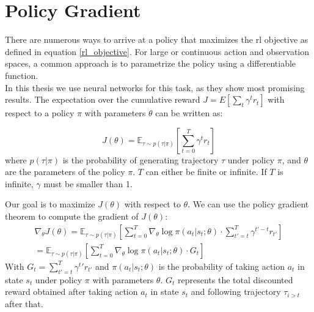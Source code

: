 \section{Policy Gradient}
There are numerous ways to arrive at a policy that maximizes the \ac{rl} objective as defined in equation 
\ref{rl_objective}. For large or continuous action and observation spaces, a common approach is 
to parametrize the policy using a differentiable function.\\ 
In this thesis we use neural networks for this task, as they show most promising results. The expectation over the cumulative 
reward $J = E[\sum_{t} \gamma^t r_t]$ with respect to a policy $\pi$ with parameters $\theta$ can be written as:

\begin{equation}
J(\theta) = \mathbb{E}_{\tau \sim p(\tau | \pi)} \left[ \sum_{t=0}^T \gamma^t r_t \right]
\end{equation}
where  $p(\tau | \pi)$ is the probability of generating trajectory $\tau$ under policy $\pi$, and $\theta$ are the parameters of the policy $\pi$. 
$T$ can either be finite or infinite. If $T$ is infinite, $\gamma$ must be smaller than 1.

Our goal is to maximize $J(\theta)$ with respect to $\theta$. We can use the policy gradient theorem to compute the gradient of $J(\theta)$:
\begin{equation}
    \label{nabla_reinforce}
    \begin{aligned}
        \nabla_{\theta} J(\theta) = \mathbb{E}_{\tau \sim p(\tau | \pi)} \left[ \sum_{t=0}^T \nabla_{\theta} \log \pi(a_t|s_t;\theta) \cdot \sum_{t'=t}^T \gamma^{t'-t} r_{t'} \right]\\
        = \mathbb{E}_{\tau \sim p(\tau | \pi)} \left[ \sum_{t=0}^T \nabla_{\theta} \log \pi(a_t|s_t;\theta) \cdot  G_t\right]
    \end{aligned}
\end{equation}
With $G_t = \sum_{t'=t}^T \gamma^t' r_{t'}$ and $\pi(a_t|s_t;\theta)$ is the probability of taking action $a_t$ in state $s_t$ under policy $\pi$ with parameters $\theta$. 
$G_t$ represents the total discounted reward obtained after taking action $a_t$ in state $s_t$ and following trajectory $\tau_{i>t}$ after that.

